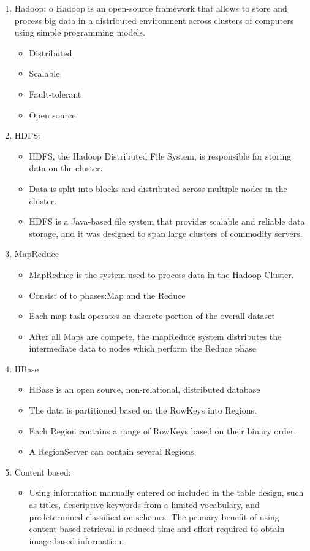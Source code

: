 \documentclass[oneside,a4paper,12pt]{report}
\begin{document}
\begin{enumerate}
\item Hadoop: o Hadoop is an open-source framework that allows to store and process big data in a distributed environment across clusters of computers using simple programming models. 
\begin{itemize}
\item Distributed
\item Scalable
\item Fault-tolerant
\item Open source
\end{itemize}

\item HDFS:
\begin{itemize}
\item HDFS, the Hadoop Distributed File System, is responsible for storing data on the cluster.
\item Data is split into blocks and distributed across multiple nodes in the cluster. 
\item HDFS is a Java-based file system that provides scalable and reliable data storage, and it was designed to span large clusters of commodity servers.
\end{itemize}


\item MapReduce
\begin{itemize}
\item MapReduce is the system used to process data in the Hadoop Cluster.
\item Consist of to phases:Map and the Reduce
\item Each map task operates on discrete portion of the overall dataset
\item After all Maps are compete, the mapReduce system distributes the intermediate data to nodes which perform the Reduce phase
\end{itemize}

\item HBase
\begin{itemize}
\item HBase is an open source, non-relational, distributed database 
\item The data is partitioned based on the RowKeys into Regions.
\item Each Region contains a range of RowKeys based on their binary order.
\item A RegionServer can contain several Regions.
\end{itemize}

\item Content based:
\begin{itemize}
\item Using information manually entered or included in the table design, such as titles, descriptive keywords from a limited vocabulary, and predetermined classification schemes. The primary benefit of using content-based retrieval is reduced time and effort required to obtain image-based information.
\end{itemize}

\end{enumerate}
\end{document}
